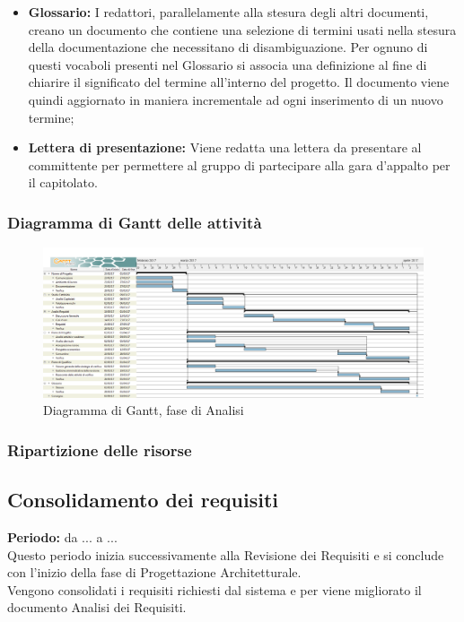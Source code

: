 \begin{itemize}
		\item \textbf{Glossario:} I redattori, parallelamente alla stesura degli altri documenti, creano un documento che contiene una selezione di termini usati nella stesura della documentazione che necessitano di disambiguazione. Per ognuno di questi vocaboli presenti nel Glossario si associa una definizione al fine di chiarire il significato del termine all'interno del progetto. Il documento viene quindi aggiornato in maniera incrementale ad ogni inserimento di un nuovo termine; \\
		\item \textbf{Lettera di presentazione:} Viene redatta una lettera da presentare al committente per permettere al gruppo di partecipare alla gara d'appalto per il capitolato. \\
	\end{itemize}
	\subsubsection{Diagramma di Gantt delle attività}
	\begin{figure}[H]
		\centering
		\includegraphics[scale=0.30]{immagini/gantt/analisi.png}
		\caption{Diagramma di Gantt, fase di Analisi}
	\end{figure}
	\subsubsection{Ripartizione delle risorse}
	\subsection{Consolidamento dei requisiti}
	\textbf{Periodo:} da ... a ... \\
	Questo periodo inizia successivamente alla Revisione dei Requisiti e si conclude con l'inizio della fase di Progettazione Architetturale. \\
	Vengono consolidati i requisiti richiesti dal sistema e per viene migliorato il documento Analisi dei Requisiti. \\
